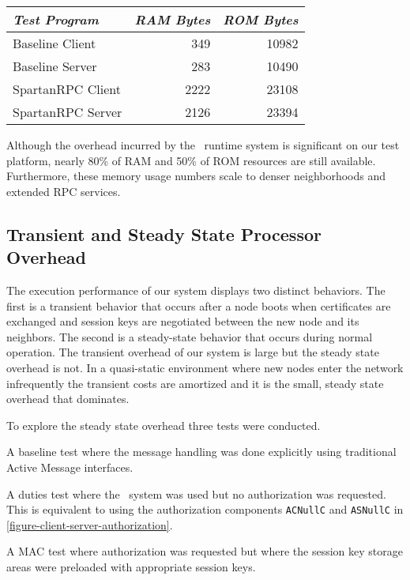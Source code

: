 \begin{table}[!t]
  \newcommand\T{\rule{0pt}{2.1ex}}
  \centering
  {
  \begin{tabular}{|l|r|r|} \hline
    \textit{Test Program} \T & \textit{RAM Bytes} & \textit{ROM Bytes} \\
    \hline \hline

    Baseline Client   \T &  349 & 10982 \\ \hline 
    Baseline Server   \T &  283 & 10490 \\ \hline
    SpartanRPC Client \T & 2222 & 23108 \\ \hline
    SpartanRPC Server \T & 2126 & 23394 \\ \hline
  \end{tabular}
  }
  \label{table-test-program-ram}
\end{table}

Although the overhead incurred by the \Sprocket\ runtime system is
significant on our test platform, nearly 80\% of RAM and 50\% of ROM
resources are still available. Furthermore, these memory usage numbers
scale to denser neighborhoods and extended RPC services.


\subsection{Transient and Steady State Processor Overhead} 

The execution performance of our system displays two distinct behaviors.
The first is a transient behavior that occurs after a node boots when
certificates are exchanged and session keys are negotiated between the
new node and its neighbors. The second is a steady-state behavior that
occurs during normal operation. The transient overhead of our system is
large but the steady state overhead is not. In a quasi-static
environment where new nodes enter the network infrequently the transient
costs are amortized and it is the small, steady state overhead that
dominates.

To explore the steady state overhead three tests were conducted.
\begin{longenum}
\item A baseline test where the message handling was done explicitly
  using traditional Active Message interfaces.
\item A duties test where the \Sprocket\ system was used but no
  authorization was requested. This is equivalent to using the
  authorization components \texttt{ACNullC} and \texttt{ASNullC} in
  \autoref{figure-client-server-authorization}.
\item A MAC test where authorization was requested but where the session
  key storage areas were preloaded with appropriate session keys.
\end{longenum}


